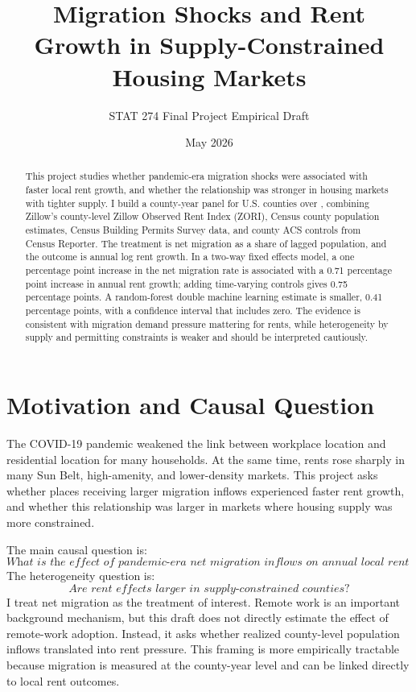 \documentclass[11pt]{article}
\title{\vspace{-1.2cm}Migration Shocks and Rent Growth in Supply-Constrained Housing Markets}
\author{STAT 274 Final Project Empirical Draft}
\date{May 2026}
\begin{document}
\maketitle
\vspace{-0.7cm}

\begin{abstract}
\noindent This project studies whether pandemic-era migration shocks were associated with faster local rent growth, and whether the relationship was stronger in housing markets with tighter supply. I build a county-year panel for \AnalysisCounties{} U.S. counties over \AnalysisYears{}, combining Zillow's county-level Zillow Observed Rent Index (ZORI), Census county population estimates, Census Building Permits Survey data, and county ACS controls from Census Reporter. The treatment is net migration as a share of lagged population, and the outcome is annual log rent growth. In a two-way fixed effects model, a one percentage point increase in the net migration rate is associated with a 0.71 percentage point increase in annual rent growth; adding time-varying controls gives 0.75 percentage points. A random-forest double machine learning estimate is smaller, 0.41 percentage points, with a confidence interval that includes zero. The evidence is consistent with migration demand pressure mattering for rents, while heterogeneity by supply and permitting constraints is weaker and should be interpreted cautiously.
\end{abstract}

\section{Motivation and Causal Question}

The COVID-19 pandemic weakened the link between workplace location and residential location for many households. At the same time, rents rose sharply in many Sun Belt, high-amenity, and lower-density markets. This project asks whether places receiving larger migration inflows experienced faster rent growth, and whether this relationship was larger in markets where housing supply was more constrained.

The main causal question is:
\[
\textit{What is the effect of pandemic-era net migration inflows on annual local rent growth?}
\]
The heterogeneity question is:
\[
\textit{Are rent effects larger in supply-constrained counties?}
\]
I treat net migration as the treatment of interest. Remote work is an important background mechanism, but this draft does not directly estimate the effect of remote-work adoption. Instead, it asks whether realized county-level population inflows translated into rent pressure. This framing is more empirically tractable because migration is measured at the county-year level and can be linked directly to local rent outcomes.
\end{document}
